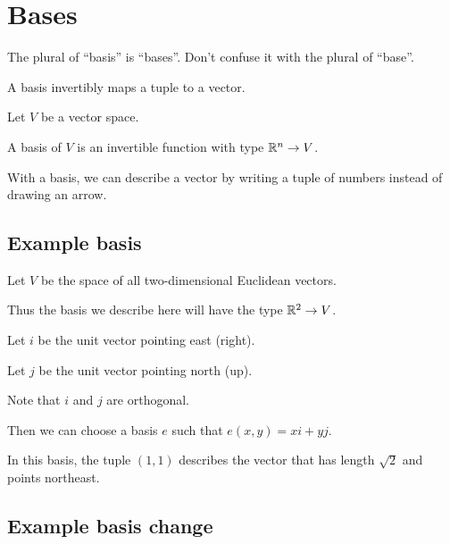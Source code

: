 \chapter{Bases}

The plural of \enquote{basis} is \enquote{bases}.
Don't confuse it with the plural of \enquote{base}.


A basis invertibly maps a tuple to a vector.

Let \(V\) be a vector space.

A basis of \(V\) is an invertible function with type \( \mathbb{R}^n \to V \).

With a basis, we can describe a vector by writing a tuple of numbers instead of drawing an arrow.

\section*{Example basis}

Let \(V\) be the space of all two-dimensional Euclidean vectors.

Thus the basis we describe here will have the type \( \mathbb{R}^2 \to V \).

Let \(i\) be the unit vector pointing east (right).

Let \(j\) be the unit vector pointing north (up).

Note that \(i\) and \(j\) are orthogonal.

Then we can choose a basis \(e\) such that \(e(x,y) = xi+yj\).

In this basis, the tuple \((1,1)\) describes the vector
that has length \(\sqrt{2}\) and points northeast.

\section*{Example basis change}

